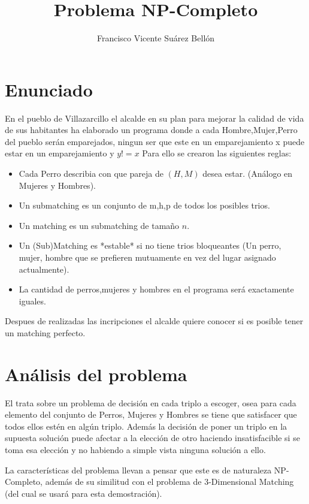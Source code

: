 \documentclass{article}
\title{Problema NP-Completo}
\author{Francisco Vicente Suárez Bellón}
\date{}
\begin{document}
\maketitle
\section{Enunciado}
En el pueblo de Villazarcillo el alcalde en su plan para mejorar la 
calidad de vida de sus habitantes ha elaborado un programa donde a cada Hombre,Mujer,Perro
del pueblo serán emparejados, ningun ser que este en un emparejamiento x puede estar en un emparejamiento y $y!=x$
Para ello se crearon las siguientes reglas:
\begin{itemize}
    \item Cada Perro describia con que pareja de $(H,M)$ desea estar. (Análogo en Mujeres y Hombres).
    \item Un submatching es un conjunto de m,h,p de todos los posibles trios.
    \item Un matching es un submatching de tamaño $n$.
    \item Un (Sub)Matching es *estable* si no tiene trios bloqueantes (Un perro, mujer, hombre que se prefieren mutuamente en vez del lugar asignado actualmente).
    \item La cantidad de perros,mujeres y hombres en el programa será exactamente iguales.
\end{itemize}
Despues de realizadas las incripciones el alcalde quiere conocer si es posible tener un matching perfecto.
\section*{Análisis del problema}
El trata sobre un problema de decisión en cada triplo a escoger, osea para cada elemento del conjunto de Perros, Mujeres y Hombres 
se tiene que satisfacer que todos ellos estén en algún triplo. Además la decisión de poner un triplo en la supuesta solución puede
afectar a la elección  de otro haciendo insatisfacible si se toma esa elección y no habiendo a simple vista ninguna solución a ello.

La características del problema llevan a pensar que este es de naturaleza NP-Completo, además de su similitud con el 
problema de 3-Dimensional Matching (del cual se usará para esta demostración).
\end{document}
